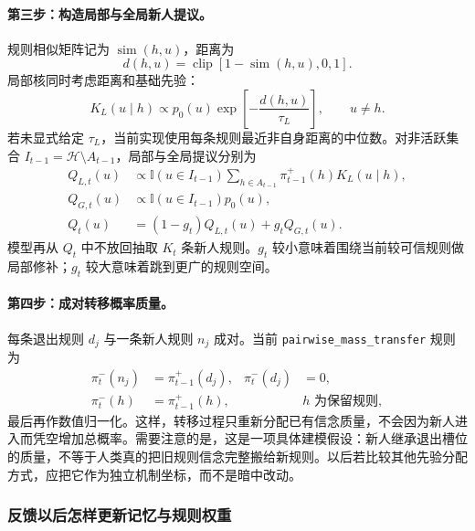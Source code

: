 \paragraph{第三步：构造局部与全局新人提议。}
规则相似矩阵记为 $\operatorname{sim}(h,u)$，距离为
\begin{equation}
d(h,u)=\operatorname{clip}\!\left[1-\operatorname{sim}(h,u),0,1\right].
\end{equation}
局部核同时考虑距离和基础先验：
\begin{equation}
K_L(u\mid h)
\propto p_0(u)\exp\!\left[-\frac{d(h,u)}{\tau_L}\right],
\qquad u\neq h.
\label{eq:model0809-local-kernel}
\end{equation}
若未显式给定 $\tau_L$，当前实现使用每条规则最近非自身距离的中位数。对非活跃集合 $I_{t-1}=\mathcal H\setminus A_{t-1}$，局部与全局提议分别为
\begin{align}
Q_{L,t}(u)
&\propto \mathbb I(u\in I_{t-1})
\sum_{h\in A_{t-1}}\pi^+_{t-1}(h)K_L(u\mid h),
\nonumber\\
Q_{G,t}(u)
&\propto \mathbb I(u\in I_{t-1})p_0(u),
\nonumber\\
Q_t(u)
&=(1-g_t)Q_{L,t}(u)+g_tQ_{G,t}(u).
\label{eq:model0809-newcomer-proposal}
\end{align}
模型再从 $Q_t$ 中不放回抽取 $K_t$ 条新人规则。$g_t$ 较小意味着围绕当前较可信规则做局部修补；$g_t$ 较大意味着跳到更广的规则空间。

\paragraph{第四步：成对转移概率质量。}
每条退出规则 $d_j$ 与一条新人规则 $n_j$ 成对。当前
\texttt{pairwise\_mass\_transfer} 规则为
\begin{align}
\pi^-_t(n_j)&=\pi^+_{t-1}(d_j),
&\pi^-_t(d_j)&=0,
\nonumber\\
\pi^-_t(h)&=\pi^+_{t-1}(h),
&&h\text{ 为保留规则},
\label{eq:model0809-mass-transfer}
\end{align}
最后再作数值归一化。这样，转移过程只重新分配已有信念质量，不会因为新人进入而凭空增加总概率。需要注意的是，这是一项具体建模假设：新人继承退出槽位的质量，不等于人类真的把旧规则信念完整搬给新规则。以后若比较其他先验分配方式，应把它作为独立机制坐标，而不是暗中改动。


\subsubsection{反馈以后怎样更新记忆与规则权重}

